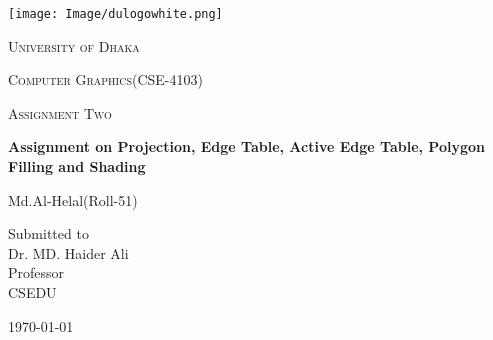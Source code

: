 \documentclass[12pt,a4paper]{report}
\begin{document}
\begin{titlepage}
\centering
\texttt{[image: Image/dulogowhite.png]}\\
{\scshape\LARGE University of Dhaka \par}
\vspace{1cm}
{\scshape\Large Computer Graphics(CSE-4103)\par}
\vspace{1cm}
{\scshape\Large Assignment Two\par}
\vspace{1.5cm}
{\huge\bfseries Assignment on Projection, Edge Table, Active Edge Table, Polygon Filling and Shading\par}
\vspace{2cm}
{\Large Md.Al-Helal(Roll-51)\par}
\vfill
Submitted to \\
\vspace{0.5cm}
Dr. MD. Haider Ali\\ Professor\\CSEDU
\vfill
{\large \today\par}
\end{titlepage}
\end{document}
